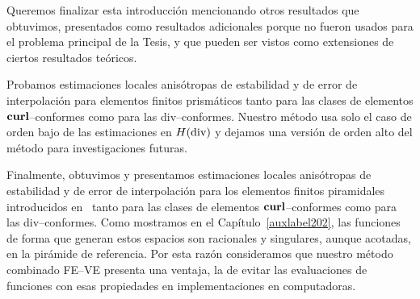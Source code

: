 Queremos finalizar esta introducci\'on mencionando otros
resultados que obtuvimos, presentados como resultados
adicionales porque no fueron usados para el problema principal 
de la Tesis, y que pueden ser vistos como extensiones 
de ciertos resultados te\'oricos.

Probamos estimaciones locales anis\'otropas 
de estabilidad y de error 
de interpolaci\'on para elementos finitos prism\'aticos
tanto para las clases de elementos 
$\textbf{curl}$--conformes como para las div--conformes.
Nuestro m\'etodo usa solo el caso de orden bajo de las 
estimaciones en $H(\operatorname{\textrm{div}})$ y dejamos una versi\'on 
de orden alto del m\'etodo para investigaciones futuras.

Finalmente, obtuvimos y presentamos estimaciones locales anis\'otropas 
de estabilidad y de error 
de interpolaci\'on para los elementos finitos piramidales
introducidos en~\cite{gh99, Nigam-2012} 
tanto para las clases de elementos 
$\textbf{curl}$--conformes como para las div--conformes.
Como mostramos en el Cap\'itulo~\ref{auxlabel202}, las funciones
de forma que generan estos espacios son racionales y singulares,
aunque acotadas, en la pir\'amide de referencia. Por esta 
raz\'on consideramos que nuestro m\'etodo combinado FE--VE
presenta una ventaja, la de evitar las evaluaciones de 
funciones con esas propiedades en implementaciones en
computadoras.
